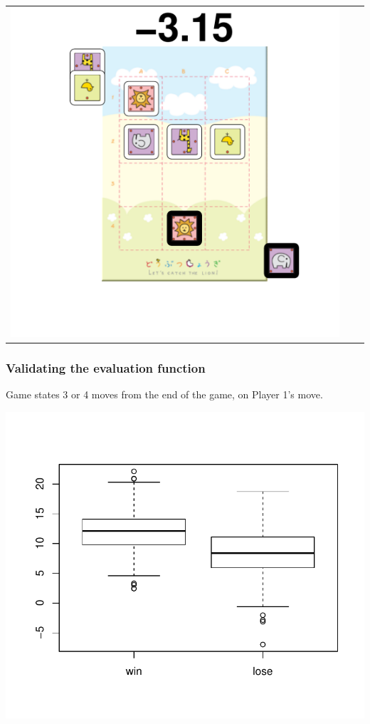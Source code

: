\documentclass{beamer}
\begin{document}
\begin{frame}
\begin{tabular}{ccc}
\includegraphics[scale = 0.15]{val6.pdf}\\
\end{tabular}
\end{frame}


\begin{frame}
\frametitle{Validating the evaluation function}
Game states 3 or 4 moves from the end of the game, on Player 1's move.
\begin{center}
\includegraphics[scale = 0.5]{validation.pdf}
\end{center}
\end{frame}
\end{document}
